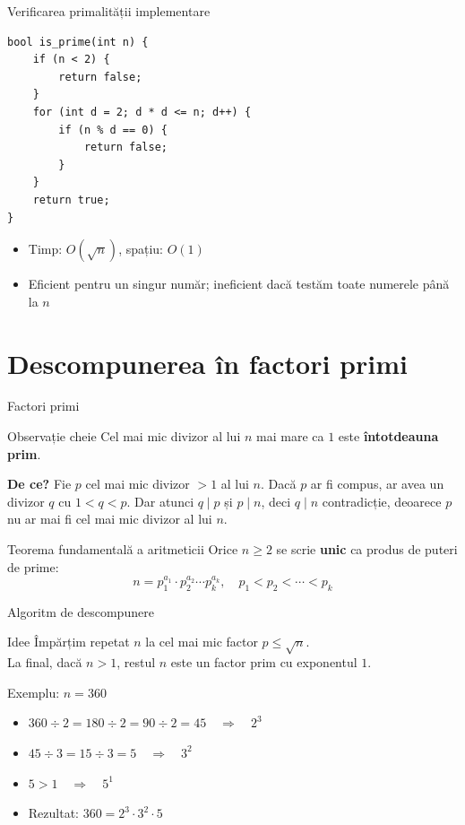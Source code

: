 \documentclass[10pt]{beamer}
\begin{document}
\begin{frame}[fragile]{Verificarea primalității \textemdash{} implementare}
  \begin{lstlisting}
bool is_prime(int n) {
    if (n < 2) {
        return false;
    }
    for (int d = 2; d * d <= n; d++) {
        if (n % d == 0) {
            return false;
        }
    }
    return true;
}
  \end{lstlisting}
  \begin{itemize}
    \item Timp: $O(\sqrt{n})$, spațiu: $O(1)$
    \item Eficient pentru un singur număr; ineficient dacă testăm toate numerele până la $n$
  \end{itemize}
\end{frame}

\section{Descompunerea în factori primi}

\begin{frame}{Factori primi}
  \begin{block}{Observație cheie}
    Cel mai mic divizor al lui $n$ mai mare ca $1$ este \textbf{întotdeauna prim}.
  \end{block}
  \textbf{De ce?} Fie $p$ cel mai mic divizor $> 1$ al lui $n$. Dacă $p$ ar fi compus,
  ar avea un divizor $q$ cu $1 < q < p$. Dar atunci $q \mid p$ și $p \mid n$, deci $q \mid n$
  \textemdash{} contradicție, deoarece $p$ nu ar mai fi cel mai mic divizor al lui $n$.
  \begin{block}{Teorema fundamentală a aritmeticii}
    Orice $n \geq 2$ se scrie \textbf{unic} ca produs de puteri de prime:
    \[
      n = p_1^{a_1} \cdot p_2^{a_2} \cdots p_k^{a_k}, \quad p_1 < p_2 < \cdots < p_k
    \]
  \end{block}
\end{frame}

\begin{frame}{Algoritm de descompunere}
  \begin{block}{Idee}
    Împărțim repetat $n$ la cel mai mic factor $p \leq \sqrt{n}$.\\
    La final, dacă $n > 1$, restul $n$ este un factor prim cu exponentul $1$.
  \end{block}
  Exemplu: $n = 360$
  \begin{itemize}
    \item $360 \div 2 = 180 \div 2 = 90 \div 2 = 45 \quad\Rightarrow\quad 2^3$
    \item $45 \div 3 = 15 \div 3 = 5 \quad\Rightarrow\quad 3^2$
    \item $5 > 1 \quad\Rightarrow\quad 5^1$
    \item Rezultat: $360 = 2^3 \cdot 3^2 \cdot 5$
  \end{itemize}
\end{frame}
\end{document}
